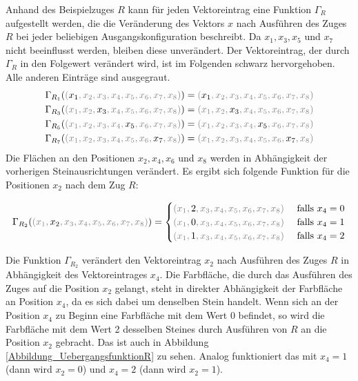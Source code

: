\documentclass[12pt,a4paper, usenames, dvipsnames]{article}
\theoremstyle{mystyle}
\theoremstyle{definition}
\begin{document}
Anhand des Beispielzuges $R$ kann für jeden Vektoreintrag eine Funktion $\Gamma_R$ aufgestellt werden, die die Veränderung des Vektors $x$ nach Ausführen des Zuges $R$ bei jeder beliebigen Ausgangskonfiguration beschreibt. Da $x_1, x_3, x_5$ und $x_7$ nicht beeinflusst werden, bleiben diese unverändert. Der Vektoreintrag, der durch $\Gamma_R$ in den Folgewert verändert wird, ist im Folgenden schwarz hervorgehoben. Alle anderen Einträge sind ausgegraut.
\begin{align*}
& \Gamma_{R_1}(\textcolor{gray}{(\textcolor{black}{x_1}, x_2, x_3, x_4, x_5, x_6, x_7, x_8  )})=\textcolor{gray}{(\textcolor{black}{x_1}, x_2, x_3, x_4, x_5, x_6, x_7, x_8  )} \\
& \Gamma_{R_3}(\textcolor{gray}{(x_1, x_2, \textcolor{black}{x_3}, x_4, x_5, x_6, x_7, x_8  )})=\textcolor{gray}{(x_1, x_2, \textcolor{black}{x_3}, x_4, x_5, x_6, x_7, x_8  )} \\
& \Gamma_{R_5}(\textcolor{gray}{(x_1, x_2, x_3, x_4, \textcolor{black}{x_5}, x_6, x_7, x_8  )})=\textcolor{gray}{(x_1, x_2, x_3, x_4, \textcolor{black}{x_5}, x_6, x_7, x_8  )}\\
& \Gamma_{R_7}(\textcolor{gray}{(x_1, x_2, x_3, x_4, x_5, x_6,\textcolor{black}{x_7}, x_8  )})=\textcolor{gray}{(x_1, x_2, x_3, x_4, x_5, x_6, \textcolor{black}{x_7}, x_8  )} 
\end{align*}
Die Flächen an den Positionen $x_2, x_4, x_6$ und $x_8$ werden in Abhängigkeit der vorherigen Steinausrichtungen verändert. Es ergibt sich folgende Funktion für die Positionen $x_2$ nach dem Zug $R$: 


\begin{align*}
\Gamma_{R_2}(\textcolor{gray}{(x_1, \textcolor{black}{x_2}, x_3, x_4, x_5, x_6, x_7, x_8  )})= \begin{cases}
\textcolor{gray}{(x_1, \textcolor{black}{2}, x_3, x_4, x_5, x_6, x_7, x_8  )} & \ \text{falls } x_4 = 0 \\ 
\textcolor{gray}{(x_1, \textcolor{black}{0}, x_3, x_4, x_5, x_6, x_7, x_8  )} & \ \text{falls } x_4 = 1 \\
\textcolor{gray}{(x_1, \textcolor{black}{1}, x_3, x_4, x_5, x_6, x_7, x_8  )} & \ \text{falls } x_4 = 2 
\end{cases}
\end{align*}

Die Funktion $\Gamma_{R_2}$ verändert den Vektoreintrag $x_2$ nach Ausführen des Zuges $R$ in Abhängigkeit des Vektoreintrages $x_4$. Die Farbfläche, die durch das Ausführen des Zuges auf die Position $x_2$ gelangt, steht in direkter Abhängigkeit der Farbfläche an Position $x_4$, da es sich dabei um denselben Stein handelt. Wenn sich an der Position $x_4$ zu Beginn eine Farbfläche mit dem Wert 0 befindet, so wird die Farbfläche mit dem Wert 2 desselben Steines durch Ausführen von $R$ an die Position $x_2$ gebracht. Das ist auch in Abbildung \ref{Abbildung_UebergangsfunktionR} zu sehen. Analog funktioniert das mit $x_4 = 1$ (dann wird $x_2 = 0$) und $x_4=2$ (dann wird $x_2 = 1$). 
\end{document}
